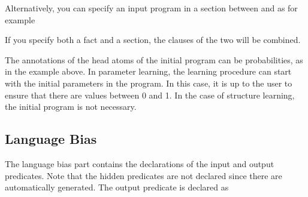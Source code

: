 \documentclass[letterpaper,10pt,english]{sphinxmanual}
\begin{document}
Alternatively, you can specify an input program in a section between  and  as for example

\begin{sphinxVerbatim}[commandchars=\\\{\}]
 

 
 
 

 
\end{sphinxVerbatim}

If you specify both a  fact and a section, the clauses of the two will be combined.

The annotations of the head atoms of the initial program can be probabilities, as in the example above. In parameter learning, the learning procedure can start with the initial parameters in the program. In this case, it is up to the user to ensure that there are values between 0 and 1. In the case of structure learning, the initial program is not necessary.


\subsection{Language Bias}
\label{\detokenize{index:language-bias}}
The language bias part contains the declarations of the input and output predicates. Note that the hidden predicates are not declared since there are automatically generated.
The output predicate is declared as

\begin{sphinxVerbatim}[commandchars=\\\{\}]
\end{sphinxVerbatim}
\end{document}
